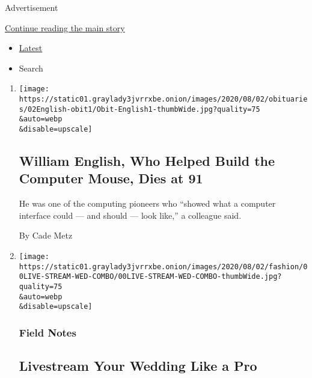Advertisement

\protect\hyperlink{after-mid2}{Continue reading the main story}

\begin{itemize}
\tightlist
\item
  \protect\hyperlink{stream-panel}{Latest}
\item
  Search
\end{itemize}

\begin{enumerate}
\def\labelenumi{\arabic{enumi}.}
\item
  \href{/2020/07/31/technology/william-english-who-helped-build-the-computer-mouse-dies-at-91.html}{}

  \texttt{[image: https://static01.graylady3jvrrxbe.onion/images/2020/08/02/obituaries/02English-obit1/Obit-English1-thumbWide.jpg?quality=75\\\&auto=webp\\\&disable=upscale]}

  \hypertarget{william-english-who-helped-build-the-computer-mouse-dies-at-91}{%
  \subsection{William English, Who Helped Build the Computer Mouse, Dies
  at
  91}\label{william-english-who-helped-build-the-computer-mouse-dies-at-91}}

  He was one of the computing pioneers who ``showed what a computer
  interface could --- and should --- look like,'' a colleague said.

  By Cade Metz
\item
  \href{/2020/07/28/fashion/weddings/livestream-your-wedding-like-a-pro.html}{}

  \texttt{[image: https://static01.graylady3jvrrxbe.onion/images/2020/08/02/fashion/00LIVE-STREAM-WED-COMBO/00LIVE-STREAM-WED-COMBO-thumbWide.jpg?quality=75\\\&auto=webp\\\&disable=upscale]}

  \hypertarget{field-notes}{%
  \subsubsection{Field Notes}\label{field-notes}}

  \hypertarget{livestream-your-wedding-like-a-pro}{%
  \subsection{Livestream Your Wedding Like a
  Pro}\label{livestream-your-wedding-like-a-pro}}


\end{enumerate}
